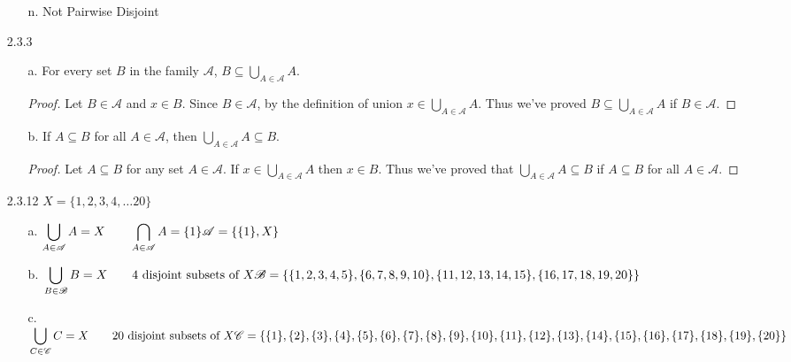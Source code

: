\documentclass[11pt]{amsart}
\theoremstyle{definition}
\begin{document}
\begin{itemize}
\begin{itemize}
    \item[n.] Not Pairwise Disjoint
    
\end{itemize}

\item[2.3.3]
\begin{itemize}
    \item[a.] For every set $B$ in the family $\mathscr{A}$, $B\subseteq \bigcup_{A\in\mathscr{A}}A$.
    \begin{proof}
        Let $B\in\mathscr{A}$ and $x\in B$. Since $B\in\mathscr{A}$, by the definition of union $x\in\bigcup_{A\in\mathscr{A}}A$. Thus we've proved $B\subseteq\bigcup_{A\in\mathscr{A}}A$ if $B\in\mathscr{A}$.
    \end{proof}

    \item[b.] If $A\subseteq B$ for all $A\in\mathscr{A}$, then $\bigcup_{A\in\mathscr{A}}A\subseteq B$.
    \begin{proof}
        Let $A\subseteq B$ for any set $A\in\mathscr{A}$. If $x\in\bigcup_{A\in\mathscr{A}}A$ then $x\in B$. Thus we've proved that $\bigcup_{A\in\mathscr{A}}A\subseteq B$ if $A\subseteq B$ for all $A\in\mathscr{A}$.
    \end{proof}

\end{itemize}

\item[2.3.12] $X=\{1,2,3,4,\ldots20\}$
\begin{itemize}
    \item[a.] $\displaystyle
              \bigcup_{A\in\mathscr{A}}A=X
              \qquad
              \bigcap_{A\in\mathscr{A}}A=\{1\} \\
              \mathscr{A}=\{\{1\},X\}$
    
    \item[b.] $\displaystyle
              \bigcup_{B\in\mathscr{B}}B=X\qquad\text{4 disjoint subsets of }X\\
              \mathscr{B}=\{\{1,2,3,4,5\},\{6,7,8,9,10\},\{11,12,13,14,15\},\{16,17,18,19,20\}\}$
    
    \item[c.] $\displaystyle
              \bigcup_{C\in\mathscr{C}}C=X\qquad\text{20 disjoint subsets of }X\\
              \mathscr{C}=\{\{1\},\{2\},\{3\},\{4\},\{5\},\{6\},\{7\},\{8\},\{9\},\{10\},\\\{11\},\{12\},\{13\},\{14\},\{15\},\{16\},\{17\},\{18\},\{19\},\{20\}\}$


\end{itemize}
\end{itemize}
\end{document}
